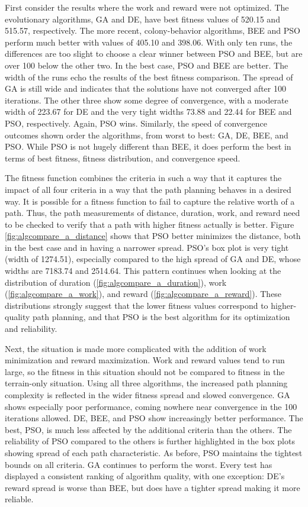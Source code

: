 \documentclass{tamuccthesis}
\begin{document}
First consider the results where the work and reward were not optimized. The evolutionary algorithms, GA and DE, have best fitness values of 520.15 and 515.57, respectively. The more recent, colony-behavior algorithms, BEE and PSO perform much better with values of 405.10 and 398.06. With only ten runs, the differences are too slight to choose a clear winner between PSO and BEE, but are over 100 below the other two. In the best case, PSO and BEE are better. The width of the runs echo the results of the best fitness comparison. The spread of GA is still wide and indicates that the solutions have not converged after 100 iterations. The other three show some degree of convergence, with a moderate width of 223.67 for DE and the very tight widths 73.88 and 22.44 for BEE and PSO, respectively. Again, PSO wins. Similarly, the speed of convergence outcomes shown order the algorithms, from worst to best: GA, DE, BEE, and PSO. While PSO is not hugely different than BEE, it does perform the best in terms of best fitness, fitness distribution, and convergence speed.

The fitness function combines the criteria in such a way that it captures the impact of all four criteria in a way that the path planning behaves in a desired way. It is possible for a fitness function to fail to capture the relative worth of a path. Thus, the path measurements of distance, duration, work, and reward need to be checked to verify that a path with higher fitness actually is better. Figure \ref{fig:algcompare_a_distance} shows that PSO better minimizes the distance, both in the best case and in having a narrower spread. PSO's box plot is very tight (width of 1274.51), especially compared to the high spread of GA and DE, whose widths are 7183.74 and 2514.64. This pattern continues when looking at the distribution of duration (\ref{fig:algcompare_a_duration}), work (\ref{fig:algcompare_a_work}), and reward (\ref{fig:algcompare_a_reward}). These distributions strongly suggest that the lower fitness values correspond to higher-quality path planning, and that PSO is the best algorithm for its optimization and reliability. 

Next, the situation is made more complicated with the addition of work minimization and reward maximization. Work and reward values tend to run large, so the fitness in this situation should not be compared to fitness in the terrain-only situation. Using all three algorithms, the increased path planning complexity is reflected in the wider fitness spread and slowed convergence. GA shows especially poor performance, coming nowhere near convergence in the 100 iterations allowed. DE, BEE, and PSO show increasingly better performance. The best, PSO, is much less affected by the additional criteria than the others. The reliability of PSO compared to the others is further highlighted in the box plots showing spread of each path characteristic. As before, PSO maintains the tightest bounds on all criteria. GA continues to perform the worst. Every test has displayed a consistent ranking of algorithm quality, with one exception: DE's reward spread is worse than BEE, but does have a tighter spread making it more reliable. 
\end{document}
